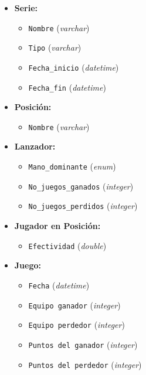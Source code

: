 \documentclass{report}
\begin{document}
\begin{itemize}
        \item \textbf{Serie:}
        \begin{itemize}
            \item \texttt{Nombre} (\textit{varchar})
            \item \texttt{Tipo} (\textit{varchar})
            \item \texttt{Fecha\_inicio} (\textit{datetime})
            \item \texttt{Fecha\_fin} (\textit{datetime}) \newline
        \end{itemize}

        \item \textbf{Posición:}
        \begin{itemize}
            \item \texttt{Nombre} (\textit{varchar}) \newline
        \end{itemize}

        \item \textbf{Lanzador:}
        \begin{itemize}
            \item \texttt{Mano\_dominante} (\textit{enum})
            \item \texttt{No\_juegos\_ganados} (\textit{integer})
            \item \texttt{No\_juegos\_perdidos} (\textit{integer}) \newline
        \end{itemize}

        \item \textbf{Jugador en Posición:}
        \begin{itemize}
            \item \texttt{Efectividad} (\textit{double}) \newline
        \end{itemize}

        \item \textbf{Juego:}
        \begin{itemize}
            \item \texttt{Fecha} (\textit{datetime})
            \item \texttt{Equipo ganador} (\textit{integer}) 
            \item \texttt{Equipo perdedor} (\textit{integer})
            \item \texttt{Puntos del ganador} (\textit{integer}) 
            \item \texttt{Puntos del perdedor} (\textit{integer}) \newline
        \end{itemize}


\end{itemize}
\end{document}
